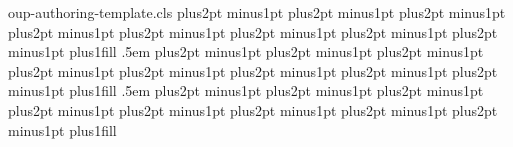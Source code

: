 \begin{filecontents*}[overwrite]{oup-authoring-template.cls}
%
{\if@contemporary{} plus2pt minus1pt plus2pt minus1pt\fi\else
{} plus2pt minus1pt plus2pt minus1pt\fi\fi}%
{\if@contemporary{} plus2pt minus1pt plus2pt minus1pt\fi\else
{} plus2pt minus1pt plus2pt minus1pt\fi\fi}%
{\if@contemporary\sffamily{}\selectfont{}\else
\if@traditional\normalsize{} plus1fill\else\normalfont\itshape\fi\fi}%
{\if@traditional-3mm\fi}%
{\if@contemporary\sffamily\selectfont\bfseries\else\bfseries\fi}%
{}%
{.5em}%
{%
  }%
%
{\if@contemporary{} plus2pt minus1pt plus2pt minus1pt\fi\else
{} plus2pt minus1pt plus2pt minus1pt\fi\fi}%
{\if@contemporary{} plus2pt minus1pt plus2pt minus1pt\fi\else
{} plus2pt minus1pt plus2pt minus1pt\fi\fi}%
{\if@contemporary\sffamily{}\selectfont{}\else
\if@traditional\normalsize{} plus1fill\else\normalfont\itshape\fi\fi}%
{\if@traditional-3mm\fi}%
{\if@contemporary\sffamily\selectfont\bfseries\else\if@traditional\bfseries\else\if@modern\normalfont\fi\fi\fi}%
{}%
{.5em}%
{%
  }%
%
{\if@contemporary{} plus2pt minus1pt plus2pt minus1pt\fi\else
{} plus2pt minus1pt plus2pt minus1pt\fi\fi}%
{\if@contemporary{} plus2pt minus1pt plus2pt minus1pt\fi\else
{} plus2pt minus1pt plus2pt minus1pt\fi\fi}%
{\if@contemporary\sffamily{}\selectfont{}\else%
\if@traditional\normalsize{} plus1fill\else\if@modern\normalfont\fi\fi\fi}%
{\if@traditional-3mm\fi}%
{\if@contemporary\sffamily\selectfont\bfseries\else\bfseries\fi}%
{}%

\end{filecontents*}
